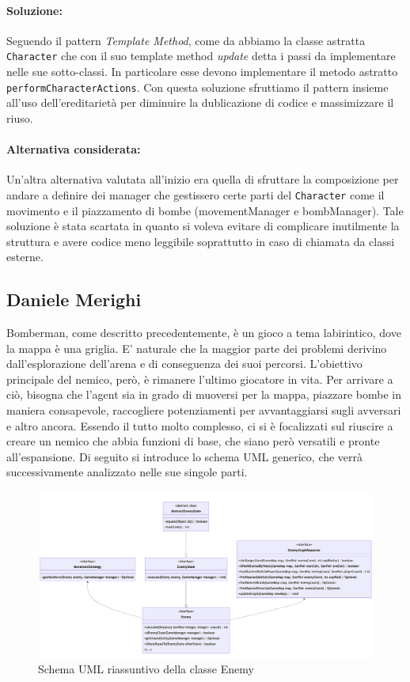 \documentclass[a4paper,12pt]{report}
\begin{document}
\paragraph{Soluzione:} Seguendo il pattern \textit{Template Method}, come da
 abbiamo la classe astratta \texttt{Character} che con il suo template method \textit{update} detta i passi da implementare nelle sue sotto-classi. In particolare esse devono implementare il metodo astratto \texttt{performCharacterActions}. Con questa soluzione sfruttiamo il pattern insieme all'uso dell'ereditarietà per diminuire la dublicazione di codice e massimizzare il riuso.
\paragraph{Alternativa considerata:} Un'altra alternativa valutata all'inizio era quella di sfruttare la composizione per andare a definire dei manager che gestissero certe parti del \texttt{Character} come il movimento e il piazzamento di bombe (movementManager e bombManager). Tale soluzione è stata scartata in quanto si voleva evitare di complicare inutilmente la struttura e avere codice meno leggibile soprattutto in caso di chiamata da classi esterne.


\subsection{Daniele Merighi}

\par
Bomberman, come descritto precedentemente, è un gioco a tema labirintico, dove la mappa è una griglia. E’ naturale che la maggior parte dei problemi derivino dall'esplorazione dell’arena e di conseguenza dei suoi percorsi. L’obiettivo principale del nemico, però, è rimanere l’ultimo giocatore in vita. Per arrivare a ciò, bisogna che l’agent sia in grado di muoversi per la mappa, piazzare bombe in maniera consapevole, raccogliere potenziamenti per avvantaggiarsi sugli avversari e altro ancora. Essendo il tutto molto complesso, ci si è focalizzati sul riuscire a creare un nemico che abbia funzioni di base, che siano però versatili e pronte all’espansione. Di seguito si introduce lo schema UML generico, che verrà successivamente analizzato nelle sue singole parti.

\begin{figure}[h]
\centering{}
\includegraphics[width=\textwidth]{img/enemyGenerics.png}
\caption{Schema UML riassuntivo della classe Enemy}
\end{figure}
\end{document}
